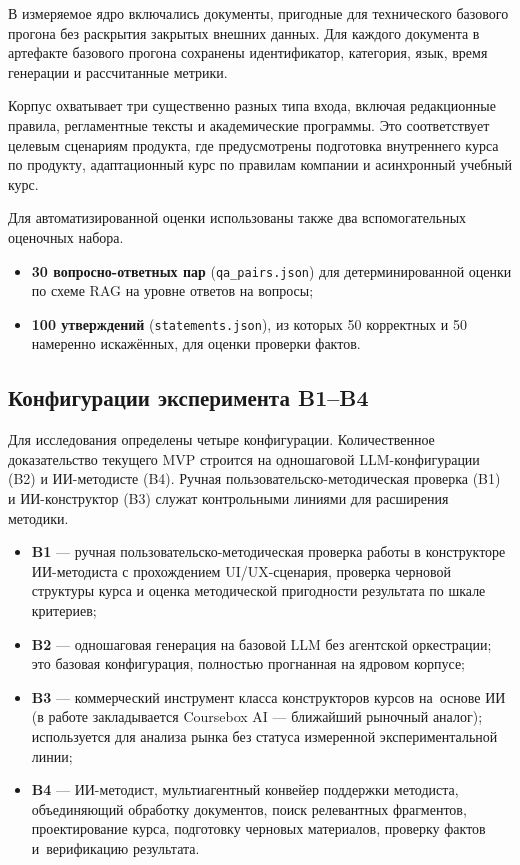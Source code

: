 В измеряемое ядро включались документы, пригодные для технического
базового прогона без раскрытия закрытых внешних данных. Для каждого
документа в артефакте базового прогона сохранены
идентификатор, категория, язык, время генерации и рассчитанные метрики.

Корпус охватывает три существенно разных типа входа, включая редакционные
правила, регламентные тексты и академические программы. Это соответствует
целевым сценариям продукта, где предусмотрены подготовка внутреннего курса
по продукту, адаптационный курс по правилам компании и асинхронный учебный курс.

Для автоматизированной оценки использованы также два вспомогательных
оценочных набора.

\begin{itemize}
  \item \textbf{30 вопросно-ответных пар} (\texttt{qa\_pairs.json}) для
    детерминированной оценки по схеме RAG на уровне ответов на вопросы;
  \item \textbf{100 утверждений} (\texttt{statements.json}), из которых
    50 корректных и 50 намеренно искажённых, для оценки проверки фактов.
\end{itemize}

\subsection[Конфигурации эксперимента и расшифровка B1–B4]{Конфигурации эксперимента B1–B4}

Для исследования определены четыре конфигурации. Количественное
доказательство текущего MVP строится на одношаговой LLM-конфигурации (B2)
и ИИ-методисте (B4). Ручная пользовательско-методическая проверка (B1)
и ИИ-конструктор (B3) служат контрольными линиями для расширения методики.

\begin{itemize}
  \item \textbf{B1} — ручная пользовательско-методическая проверка
    работы в конструкторе ИИ-методиста с прохождением UI/UX-сценария,
    проверка черновой структуры курса и оценка методической пригодности
    результата по шкале критериев;
  \item \textbf{B2} — одношаговая генерация на базовой LLM без агентской
    оркестрации; это базовая конфигурация, полностью прогнанная на ядровом корпусе;
  \item \textbf{B3} — коммерческий инструмент класса конструкторов курсов на~основе ИИ
    (в работе закладывается Coursebox AI — ближайший рыночный аналог);
    используется для анализа рынка без статуса измеренной
    экспериментальной линии;
  \item \textbf{B4} — ИИ-методист, мультиагентный конвейер поддержки
    методиста, объединяющий обработку документов, поиск релевантных фрагментов,
    проектирование курса, подготовку черновых материалов, проверку
    фактов и~верификацию результата.
\end{itemize}

